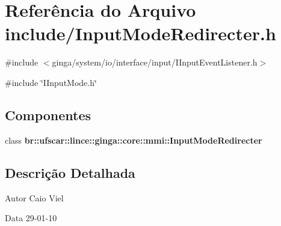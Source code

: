 \section{Referência do Arquivo include/InputModeRedirecter.h}
\label{InputModeRedirecter_8h}
{\ttfamily \#include $<$ginga/system/io/interface/input/IInputEventListener.h$>$}\par
{\ttfamily \#include \char`\"{}IInputMode.h\char`\"{}}\par
\subsection*{Componentes}
\begin{DoxyCompactItemize}
\item 
class {\bf br::ufscar::lince::ginga::core::mmi::InputModeRedirecter}
\end{DoxyCompactItemize}


\subsection{Descrição Detalhada}
\begin{DoxyAuthor}{Autor}
Caio Viel 
\end{DoxyAuthor}
\begin{DoxyDate}{Data}
29-\/01-\/10 
\end{DoxyDate}
